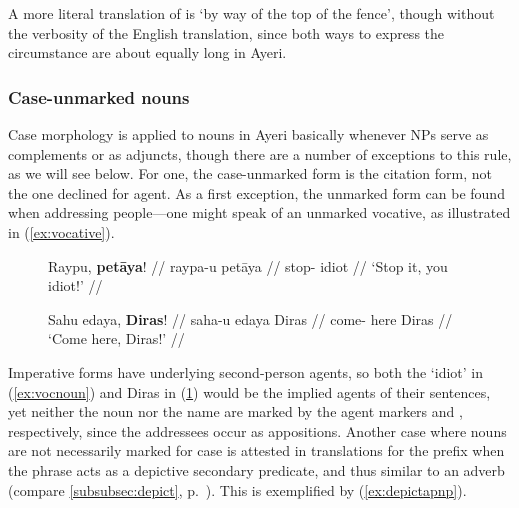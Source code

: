 A more literal translation of  is `by
way of the top of the fence', though without the verbosity of the English
translation, since both ways to express the circumstance are about equally long
in Ayeri.


\subsubsection{Case-unmarked nouns}
\label{subsec:uncased}

Case morphology is applied to nouns in Ayeri basically whenever NPs serve as
complements or as adjuncts, though there are a number of exceptions to this rule,
as we will see below. For one, the case-unmarked form is the citation form, not
the one declined for agent. As a first exception, the unmarked form can be
found when addressing people---one might speak of an unmarked vocative, as
illustrated in (\ref{ex:vocative}).

\begin{figure}[h]
\pex\label{ex:vocative}
\a\label{ex:vocnoun}\begingl
	\gla Raypu, \textbf{petāya}! //
	\glb raypa-u petāya //
	\glc stop-\Imp{} idiot //
	\glft `Stop it, you idiot!' //
\endgl

\a\label{ex:vocname}\begingl
	\gla Sahu edaya, \textbf{Diras}! //
	\glb saha-u edaya Diras //
	\glc come-\Imp{} here Diras //
	\glft `Come here, Diras!' //
\endgl
\xe
\end{figure}

Imperative forms have underlying second-person agents, so both the `idiot' in
(\ref{ex:vocnoun}) and Diras in (\ref{ex:vocname}) would be the implied agents
of their sentences, yet neither the noun nor the name are marked by the agent
markers  and , respectively, since the
addressees occur as appositions. Another case where nouns are not necessarily
marked for case is attested in translations for the prefix
 when the phrase acts as a depictive secondary
predicate, and thus similar to an adverb (compare \autoref{subsubsec:depict},
p.~\pageref{subsubsec:depict}). This is exemplified by
(\ref{ex:depictapnp}).

